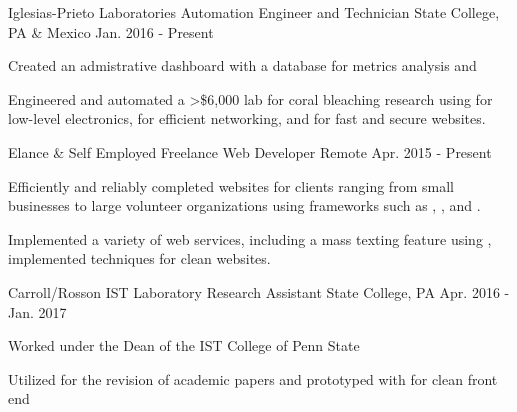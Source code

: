 

\begin{cventries}

  \cventry
    {Iglesias-Prieto Laboratories} %
    {Automation Engineer and Technician} %
    {State College, PA \& Mexico} %
    {Jan. 2016 - Present} %
    {
      \begin{cvitems} %
        \item {Created an admistrative dashboard with a  database for metrics analysis and }
	\item {Engineered and automated a >\$6,000 lab for coral bleaching research using  for low-level electronics,  for efficient networking, and  for fast and secure websites. }
      \end{cvitems}
    }

  \cventry
    {Elance \& Self Employed}
    {Freelance Web Developer} %
    {Remote} %
    {Apr. 2015 - Present } %
    {
      \begin{cvitems} %
      \item {Efficiently and reliably completed websites for clients ranging from small businesses to large volunteer organizations using frameworks such as , , and .} 
      \item {Implemented a variety of web services, including a mass texting feature using , implemented  techniques for clean websites.}
      \end{cvitems}
    }
   
  \cventry
    {Carroll/Rosson IST Laboratory} %
    {Research Assistant} %
    {State College, PA} %
    {Apr. 2016 - Jan. 2017} %
    {
      \begin{cvitems} %
        \item {Worked under the Dean of the IST College of Penn State}
	\item {Utilized  for the revision of academic papers and prototyped with  for clean front end }
      \end{cvitems}
    }
   
\end{cventries}
